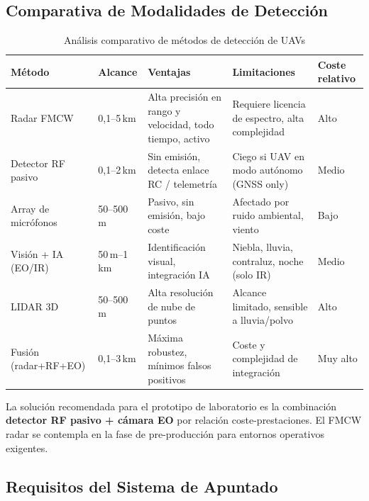 \documentclass[12pt,a4paper]{article}
\begin{document}
\subsection{Comparativa de Modalidades de Detección}

\begin{table}[H]
\centering
\caption{Análisis comparativo de métodos de detección de UAVs}
\label{tab:deteccion}
\renewcommand{\arraystretch}{1.25}
\begin{tabularx}{\textwidth}{lXXXl}
\toprule
\textbf{Método} &
\textbf{Alcance} &
\textbf{Ventajas} &
\textbf{Limitaciones} &
\textbf{Coste relativo} \\
\midrule
Radar FMCW &
  0,1–5\,km &
  Alta precisión en rango y velocidad, todo tiempo, activo &
  Requiere licencia de espectro, alta complejidad &
  Alto \\[3pt]

Detector RF pasivo &
  0,1–2\,km &
  Sin emisión, detecta enlace RC / telemetría &
  Ciego si UAV en modo autónomo (GNSS only) &
  Medio \\[3pt]

Array de micrófonos &
  50–500\,m &
  Pasivo, sin emisión, bajo coste &
  Afectado por ruido ambiental, viento &
  Bajo \\[3pt]

Visión + IA (EO/IR) &
  50\,m–1\,km &
  Identificación visual, integración IA &
  Niebla, lluvia, contraluz, noche (solo IR) &
  Medio \\[3pt]

LIDAR 3D &
  50–500\,m &
  Alta resolución de nube de puntos &
  Alcance limitado, sensible a lluvia/polvo &
  Alto \\[3pt]

Fusión (radar+RF+EO) &
  0,1–3\,km &
  Máxima robustez, mínimos falsos positivos &
  Coste y complejidad de integración &
  Muy alto \\
\bottomrule
\end{tabularx}
\end{table}

\begin{notatec}
  La solución recomendada para el prototipo de laboratorio es la
  combinación \textbf{detector RF pasivo + cámara EO} por relación
  coste-prestaciones. El FMCW radar se contempla en la fase de
  pre-producción para entornos operativos exigentes.
\end{notatec}

\subsection{Requisitos del Sistema de Apuntado}
\end{document}
